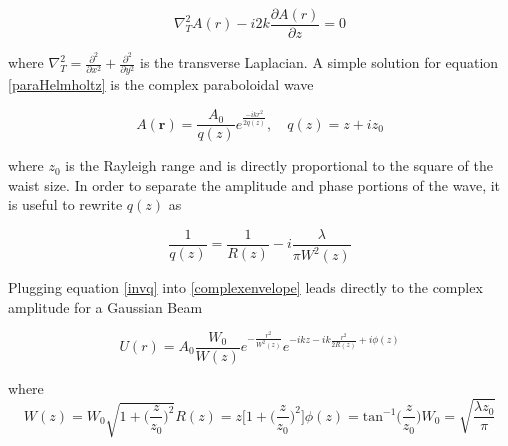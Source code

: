 		\begin{equation}\label{paraHelmholtz}
		\nabla_T^2 A(r) - i2k \frac{\partial A(r)}{\partial z} = 0
		\end{equation}
		
		where $\nabla_T^2 = \frac{\partial^2}{\partial x^2} + \frac{\partial^2}{\partial y^2} $ is the transverse Laplacian.  A simple solution for equation \ref{paraHelmholtz} is the complex paraboloidal wave
		
		\begin{equation} \label{complexenvelope}
		A(\mathbf{r}) = \frac{A_0}{q(z)} e^{\frac{-ikr^2}{2q(z)}} , \quad q(z)=z+iz_0
		\end{equation}
		
		where $z_0$ is the Rayleigh range and is directly proportional to the square of the waist size.  In order to separate the amplitude and phase portions of the wave, it is useful to rewrite $q(z)$ as
		
		\begin{equation}\label{invq}
		\frac{1}{q(z)} = \frac{1}{R(z)} - i \frac{\lambda}{\pi W^2(z)}
		\end{equation} 
		
		Plugging equation \ref{invq} into \ref{complexenvelope} leads directly to the complex amplitude for a Gaussian Beam
		
		\begin{equation}
		U(r) = A_0 \frac{W_0}{W(z)} e^{-\frac{r^2}{W^2(z)}} e^{-ikz - ik \frac{r^2}{2R(z)} + i \phi(z)}
		\end{equation}
		
		where
		\begin{subequations}
		\begin{equation}
		W(z) = W_0 \sqrt{1 + \bigg( \frac{z}{z_0} \bigg)^2}
		\end{equation}
		\begin{equation}\label{ROC}
		R(z) = z \bigg[ 1 + \bigg( \frac{z}{z_0} \bigg)^2 \bigg]
		\end{equation}
		\begin{equation}\label{gouy}
		\phi(z)= \text{tan}^{-1}\bigg(\frac{z}{z_0}\bigg)
		\end{equation}
		\begin{equation}
		W_0 = \sqrt{\frac{\lambda z_0}{\pi}}
		\end{equation}
		\end{subequations}


